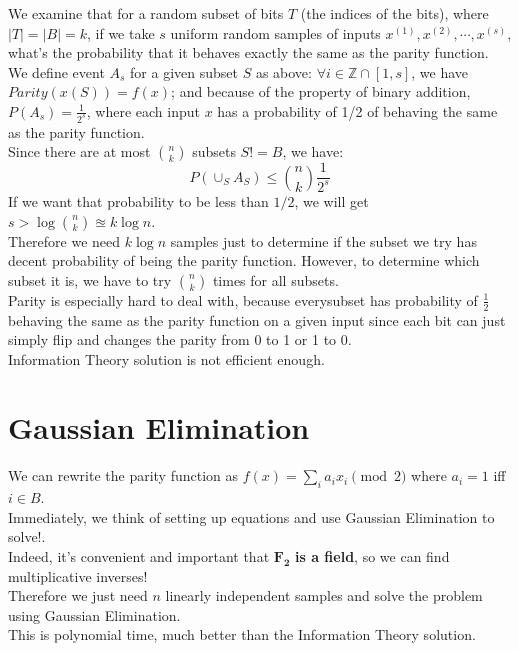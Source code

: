 \documentclass[12pt]{article}
\begin{document}
\noindent We examine that for a random subset of bits $T$ (the indices of the bits), where $|T| = |B| = k$, if we take $s$ uniform random samples of inputs $x^{(1)}, x^{(2)}, \cdots, x^{(s)}$, what's the probability that it behaves exactly the same as the parity function.\\
\newline
We define event $A_s$ for a given subset $S$ as above: $\forall i \in \mathbb{Z} \cap [1, s]$, we have $Parity(x(S)) = f(x)$; and because of the property of binary addition, $P(A_s) = \frac{1}{2^s}$, where each input $x$ has a probability of 1/2 of behaving the same as the parity function.\\
\newline
Since there are at most $n \choose k$ subsets $S != B$, we have:
$$P(\cup_{S}A_{S}) \leq {n \choose k}\frac{1}{2^s}$$
If we want that probability to be less than $1/2$, we will get $s > \log{n \choose k} \approxeq k\log{n}$.\\
\newline
Therefore we need $k\log{n}$ samples just to determine if the subset we try has decent probability of being the parity function. However, to determine which subset it is, we have to try $n \choose k$ times for all subsets. \\
\newline
Parity is especially hard to deal with, because everysubset has probability of $\frac{1}{2}$ behaving the same as the parity function on a given input since each bit can just simply flip and changes the parity from 0 to 1 or 1 to 0. \\
\newline
Information Theory solution is not efficient enough.

\section{Gaussian Elimination}
We can rewrite the parity function as $f(x) = \sum_{i}^{}a_ix_i \pmod{2}$ where $a_i = 1$ iff $i \in B$.\\
\newline
Immediately, we think of setting up equations and use Gaussian Elimination to solve!. \\
\newline
Indeed, it's convenient and important that $\pmb{F_2}$ \textbf{is a field}, so we can find multiplicative inverses!\\
\newline
Therefore we just need $n$ linearly independent samples and solve the problem using Gaussian Elimination.\\
\newline
This is polynomial time, much better than the Information Theory solution.
\end{document}
